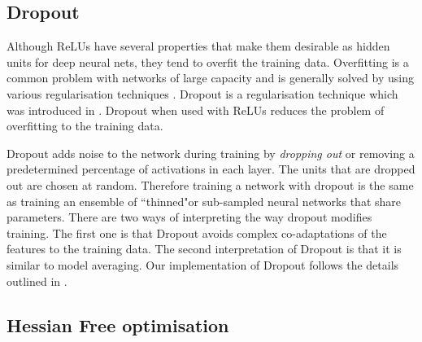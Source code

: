 \documentclass{article}
\begin{document}
\vspace{-0.5em}
\subsection{Dropout}
\label{sec:page} 

Although ReLUs have several properties that make them desirable as hidden units for deep neural nets, they tend to overfit the training data. Overfitting is a common problem with networks of large capacity and is generally solved by using various regularisation techniques \cite{bishop1995neural}. Dropout is a regularisation technique which was introduced in \cite{hinton2012improving}. Dropout when used with ReLUs reduces the problem of overfitting to the training data. 

Dropout adds noise to the network during training by \textit{dropping out} or removing a predetermined percentage of activations in each layer. The units that are dropped out are chosen at random. Therefore training a network with dropout is the same as training an ensemble of ``thinned"or sub-sampled neural networks that share parameters. There are two ways of interpreting the way dropout modifies training. The first one is that Dropout avoids complex co-adaptations of the features to the training data. The second interpretation of Dropout is that it is similar to model averaging. Our implementation of Dropout follows the details outlined in \cite{dahl2013improving}.


\subsection{Hessian Free optimisation}
\end{document}

